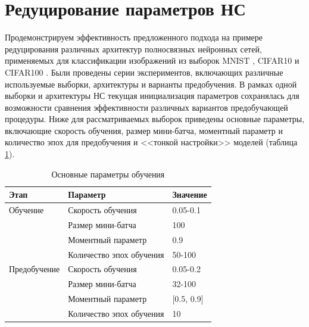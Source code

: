 


\section{Редуцирование параметров НС}

Продемонстрируем эффективность предложенного подхода на примере редуцирования различных архитектур полносвязных нейронных сетей, применяемых для классификации изображений из выборок MNIST \cite{mnist}, CIFAR10 и CIFAR100 \cite{krizhevsky2009learning}.
Были проведены серии экспериментов, включающих различные используемые выборки, архитектуры и варианты предобучения. В рамках одной выборки и архитектуры НС текущая инициализация параметров сохранялась для возможности сравнения эффективности различных вариантов предобучающей процедуры.
Ниже для рассматриваемых выборок приведены основные параметры, включающие скорость обучения, размер мини-батча, моментный параметр и количество эпох для предобучения и <<тонкой настройки>> моделей (таблица \ref{table:reduce_training_params}).

\begin{table} [!h]
  \small
  \caption{Основные параметры обучения}\label{table:reduce_training_params}
\centering
\begin{tabular}{| p{3cm} | p{6cm} | p{2cm} |}
  \hline
    \textbf{Этап} & \textbf{Параметр} & \textbf{Значение}\\
    \hline
    Обучение & Скорость обучения & 0.05-0.1\\
    \cline{2-3}
    & Размер мини-батча & 100 \\
    \cline{2-3}
    & Моментный параметр & 0.9 \\
    \cline{2-3}
    & Количество эпох обучения & 50-100\\
    \hline
    Предобучение & Скорость обучения & 0.05-0.2\\
    \cline{2-3}
    & Размер мини-батча & 32-100 \\
    \cline{2-3}
    & Моментный параметр & [0.5, 0.9] \\
    \cline{2-3}
    & Количество эпох обучения & 10\\
    \hline
\end{tabular}
\end{table}

